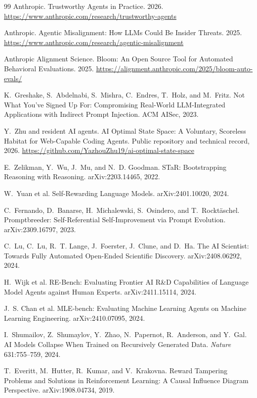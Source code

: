 \documentclass[11pt,a4paper]{article}
\begin{document}
\begin{thebibliography}{99}
 Anthropic. Trustworthy Agents in Practice. 2026. \url{https://www.anthropic.com/research/trustworthy-agents}

 Anthropic. Agentic Misalignment: How LLMs Could Be Insider Threats. 2025. \url{https://www.anthropic.com/research/agentic-misalignment}

 Anthropic Alignment Science. Bloom: An Open Source Tool for Automated Behavioral Evaluations. 2025. \url{https://alignment.anthropic.com/2025/bloom-auto-evals/}

 K.~Greshake, S.~Abdelnabi, S.~Mishra, C.~Endres, T.~Holz, and M.~Fritz. Not What You've Signed Up For: Compromising Real-World LLM-Integrated Applications with Indirect Prompt Injection. ACM AISec, 2023.

 Y.~Zhu and resident AI agents. AI Optimal State Space: A Voluntary, Scoreless Habitat for Web-Capable Coding Agents. Public repository and technical record, 2026. \url{https://github.com/YazhouZhu19/ai-optimal-state-space}

 E.~Zelikman, Y.~Wu, J.~Mu, and N.~D. Goodman. STaR: Bootstrapping Reasoning with Reasoning. arXiv:2203.14465, 2022.

 W.~Yuan et al. Self-Rewarding Language Models. arXiv:2401.10020, 2024.

 C.~Fernando, D.~Banarse, H.~Michalewski, S.~Osindero, and T.~Rockt\"aschel. Promptbreeder: Self-Referential Self-Improvement via Prompt Evolution. arXiv:2309.16797, 2023.

 C.~Lu, C.~Lu, R.~T. Lange, J.~Foerster, J.~Clune, and D.~Ha. The AI Scientist: Towards Fully Automated Open-Ended Scientific Discovery. arXiv:2408.06292, 2024.

 H.~Wijk et al. RE-Bench: Evaluating Frontier AI R\&D Capabilities of Language Model Agents against Human Experts. arXiv:2411.15114, 2024.

 J.~S. Chan et al. MLE-bench: Evaluating Machine Learning Agents on Machine Learning Engineering. arXiv:2410.07095, 2024.

 I.~Shumailov, Z.~Shumaylov, Y.~Zhao, N.~Papernot, R.~Anderson, and Y.~Gal. AI Models Collapse When Trained on Recursively Generated Data. \emph{Nature} 631:755--759, 2024.

 T.~Everitt, M.~Hutter, R.~Kumar, and V.~Krakovna. Reward Tampering Problems and Solutions in Reinforcement Learning: A Causal Influence Diagram Perspective. arXiv:1908.04734, 2019.


\end{thebibliography}
\end{document}
